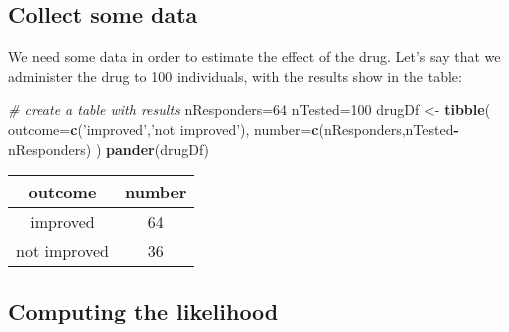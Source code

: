 \documentclass[]{book}
\newenvironment{Shaded}{\begin{snugshade}}{\end{snugshade}}
\newcommand{\KeywordTok}[1]{\textcolor[rgb]{0.13,0.29,0.53}{\textbf{#1}}}
\newcommand{\DataTypeTok}[1]{\textcolor[rgb]{0.13,0.29,0.53}{#1}}
\newcommand{\DecValTok}[1]{\textcolor[rgb]{0.00,0.00,0.81}{#1}}
\newcommand{\StringTok}[1]{\textcolor[rgb]{0.31,0.60,0.02}{#1}}
\newcommand{\CommentTok}[1]{\textcolor[rgb]{0.56,0.35,0.01}{\textit{#1}}}
\newcommand{\OperatorTok}[1]{\textcolor[rgb]{0.81,0.36,0.00}{\textbf{#1}}}
\newcommand{\NormalTok}[1]{#1}
\theoremstyle{definition}
\theoremstyle{definition}
\theoremstyle{definition}
\theoremstyle{remark}
\begin{document}
\subsection{Collect some data}\label{collect-some-data-1}

We need some data in order to estimate the effect of the drug. Let's say
that we administer the drug to 100 individuals, with the results show in
the table:

\begin{Shaded}
\begin{Highlighting}[]
\CommentTok{# create a table with results}
\NormalTok{nResponders=}\DecValTok{64}
\NormalTok{nTested=}\DecValTok{100}
\NormalTok{drugDf <-}\StringTok{ }\KeywordTok{tibble}\NormalTok{(}
  \DataTypeTok{outcome=}\KeywordTok{c}\NormalTok{(}\StringTok{'improved'}\NormalTok{,}\StringTok{'not improved'}\NormalTok{),}
  \DataTypeTok{number=}\KeywordTok{c}\NormalTok{(nResponders,nTested}\OperatorTok{-}\NormalTok{nResponders)}
\NormalTok{)}
\KeywordTok{pander}\NormalTok{(drugDf)}
\end{Highlighting}
\end{Shaded}

\begin{longtable}[]{@{}cc@{}}
\toprule
\begin{minipage}[b]{0.20\columnwidth}\centering\strut
outcome\strut
\end{minipage} & \begin{minipage}[b]{0.10\columnwidth}\centering\strut
number\strut
\end{minipage}\tabularnewline
\midrule
\endhead
\begin{minipage}[t]{0.20\columnwidth}\centering\strut
improved\strut
\end{minipage} & \begin{minipage}[t]{0.10\columnwidth}\centering\strut
64\strut
\end{minipage}\tabularnewline
\begin{minipage}[t]{0.20\columnwidth}\centering\strut
not improved\strut
\end{minipage} & \begin{minipage}[t]{0.10\columnwidth}\centering\strut
36\strut
\end{minipage}\tabularnewline
\bottomrule
\end{longtable}

\subsection{Computing the likelihood}\label{computing-the-likelihood-1}
\end{document}
